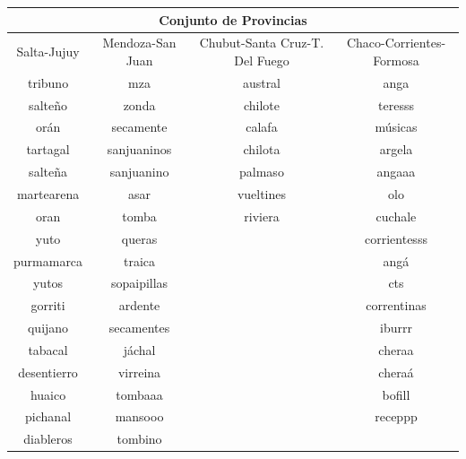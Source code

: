 \begin{table}[]
\centering
{%
\begin{tabular}{|c|c|c|c|}
\hline
\multicolumn{4}{|c|}{Conjunto de Provincias} \\ \hline
\hline
Salta-Jujuy & Mendoza-San Juan & Chubut-Santa Cruz-T. Del Fuego & Chaco-Corrientes-Formosa   \\ \hline
tribuno     & mza              & austral                        & anga                       \\
salteño     & zonda            & chilote                        & teresss                    \\
orán        & secamente        & calafa                         & músicas                    \\
tartagal    & sanjuaninos      & chilota                        & argela                     \\
salteña     & sanjuanino       & palmaso                        & angaaa                     \\
martearena  & asar             & vueltines                      & olo                        \\
oran        & tomba            & riviera                        & cuchale                    \\
yuto        & queras           &                                & corrientesss               \\
purmamarca  & traica           &                                & angá                       \\
yutos       & sopaipillas      &                                & cts                        \\
gorriti     & ardente          &                                & correntinas                \\
quijano     & secamentes       &                                & iburrr                     \\
tabacal     & jáchal           &                                & cheraa                     \\
desentierro & virreina         &                                & cheraá                     \\
huaico      & tombaaa          &                                & bofill                     \\
pichanal    & mansooo          &                                & receppp                    \\
diableros   & tombino          &                                &                            \\

\end{tabular}}
\end{table}
